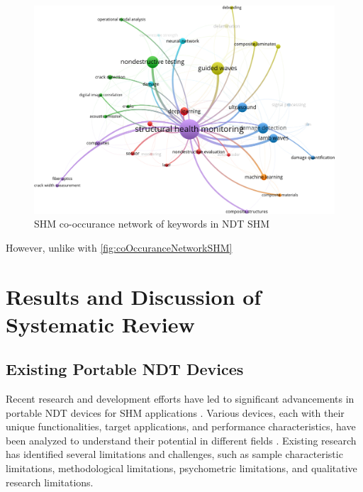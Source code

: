 \documentclass[journal, a4paper]{IEEEtran}
\begin{document}
\begin{figure}[h]
  \centering
  \includegraphics[width=\columnwidth]{./img/co_occurance_network_shm.jpg}
  \caption{SHM co-occurance network of keywords in NDT SHM}
  \label{fig:coOccuranceNetworkSHM}
\end{figure}

However, unlike with \autoref{fig:coOccuranceNetworkSHM} \lipsum[1]






\section{Results and Discussion of Systematic Review}

\subsection{Existing Portable NDT Devices}
Recent research and development efforts have led to significant advancements in portable NDT devices
for SHM applications \cite{Vijayan2023} \cite{Parsy2018} \cite{Hassani2023}.
Various devices, each with their unique functionalities, target applications, and performance characteristics,
have been analyzed to understand their potential in different fields \cite{Khanna2020} \cite{Baig2021} \cite{Corzo2020}.
Existing research has identified several limitations and challenges, such as sample characteristic limitations,
methodological limitations, psychometric limitations, and qualitative research limitations.
\end{document}
